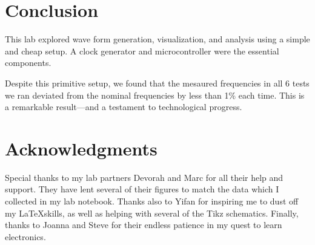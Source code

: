 \documentclass[lettersize,journal]{IEEEtran}
\begin{document}
\section{Conclusion}

This lab explored wave form generation, visualization, and analysis using a simple and cheap setup. A clock generator and microcontroller were the essential components.

Despite this primitive setup, we found that the mesaured frequencies in all 6 tests we ran deviated from the nominal frequencies by less than 1\% each time. This is a remarkable result---and a testament to technological progress.

\section*{Acknowledgments}
Special thanks to my lab partners Devorah and Marc for all their help and support. They have lent several of their figures to match the data which I collected in my lab notebook. Thanks also to Yifan for inspiring me to dust off my \LaTeX skills, as well as helping with several of the Tikz schematics. Finally, thanks to Joanna and Steve for their endless patience in my quest to learn electronics.



% 


\end{document}
